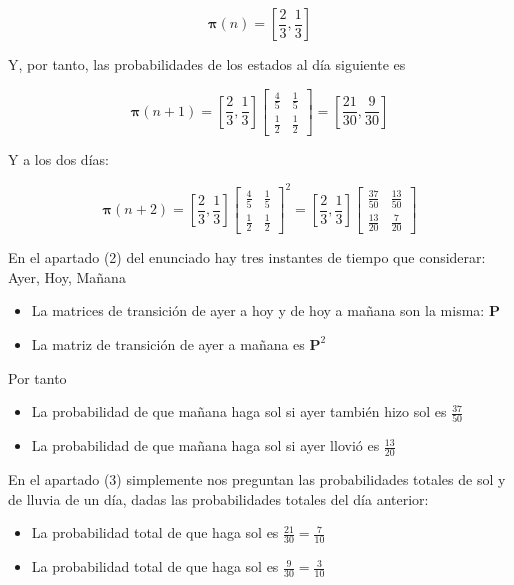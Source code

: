 \documentclass[11pt]{article}
\providecommand{\tightlist}{%
      \setlength{\itemsep}{0pt}\setlength{\parskip}{0pt}}
\begin{document}
\[
\boldsymbol{\pi}(n) = [\frac{2}{3}, \frac{1}{3}]
\]

Y, por tanto, las probabilidades de los estados al día siguiente es

\[
\boldsymbol{\pi}(n+1) = [\frac{2}{3}, \frac{1}{3}] \begin{bmatrix}
\frac{4}{5} & \frac{1}{5}\\
\frac{1}{2} & \frac{1}{2}
\end{bmatrix} = 
[\frac{21}{30}, \frac{9}{30}]
\]

Y a los dos días:

\[
\boldsymbol{\pi}(n+2) = [\frac{2}{3}, \frac{1}{3}] \begin{bmatrix}
\frac{4}{5} & \frac{1}{5}\\
\frac{1}{2} & \frac{1}{2}
\end{bmatrix}^2 = 
[\frac{2}{3}, \frac{1}{3}]
\begin{bmatrix}
\frac{37}{50} & \frac{13}{50}\\
\frac{13}{20} & \frac{7}{20}
\end{bmatrix} 
\]

    En el apartado (2) del enunciado hay tres instantes de tiempo que
considerar: Ayer, Hoy, Mañana

\begin{itemize}
\tightlist
\item
  La matrices de transición de ayer a hoy y de hoy a mañana son la
  misma: \(\mathbf{P}\)
\item
  La matriz de transición de ayer a mañana es \(\mathbf{P}^2\)
\end{itemize}

Por tanto

\begin{itemize}
\tightlist
\item
  La probabilidad de que mañana haga sol si ayer también hizo sol es
  \(\frac{37}{50}\)
\item
  La probabilidad de que mañana haga sol si ayer llovió es
  \(\frac{13}{20}\)
\end{itemize}

En el apartado (3) simplemente nos preguntan las probabilidades totales
de sol y de lluvia de un día, dadas las probabilidades totales del día
anterior:

\begin{itemize}
\tightlist
\item
  La probabilidad total de que haga sol es
  \(\frac{21}{30}=\frac{7}{10}\)
\item
  La probabilidad total de que haga sol es \(\frac{9}{30}=\frac{3}{10}\)
\end{itemize}
\end{document}

